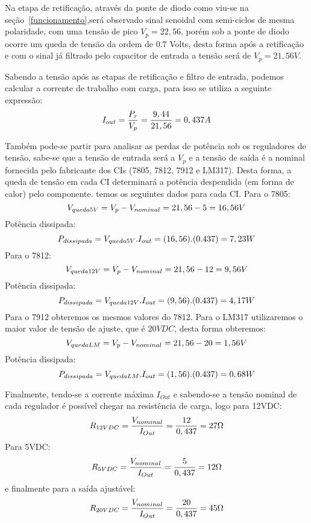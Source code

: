 \documentclass[
	article,			%
	11pt,				%
	oneside,			%
	a4paper,			%
	english,			%
	brazil,				%
	sumario=tradicional
	]{abntex2}
\begin{document}
Na etapa de retificação, através da ponte de diodo como viu-se na seção~\ref{funcionamento},será observado sinal senoidal com semi-ciclos de mesma polaridade, com uma tensão de pico $V_p = 22,56$, porém sob a ponte de diodo ocorre um queda de tensão da ordem de $0.7$ Volts, desta forma após a retificação e com o sinal já filtrado pelo capacitor de entrada a tensão será de \textbf{$V_p = 21,56V$}.

Sabendo a tensão após as etapas de retificação e filtro de entrada, podemos calcular a corrente de trabalho com carga, para isso se utiliza a seguinte expressão:
$$
I_{out} = \frac{P_r}{V_p}\nonumber\\
= \frac{9,44}{21,56}\nonumber\\
= 0,437 A
$$

Também pode-se partir para analisar as perdas de potência sob os reguladores de tensão, sabe-se que a tensão de entrada será a $V_p$ e a tensão de saída é a nominal fornecida pelo fabricante dos CIs (7805, 7812, 7912 e LM317). Desta forma, a queda de tensão em cada CI determinará a potência despendida (em forma de calor) pelo componente. temos os seguintes dados para cada CI. Para o 7805:
$$V_{queda5V} = V_p - V_{nominal}\\
= 21,56 - 5\\
= 16,56V
$$
Potência dissipada:
$$ P_{dissipada} = V_{queda5V}.I_{out}\\
= (16,56).(0.437)\\
= 7,23 W
$$
Para o 7812:
$$V_{queda12V} = V_p - V_{nominal}\\
= 21,56 - 12\\
= 9,56V
$$
Potência dissipada:
$$ P_{dissipada} = V_{queda12V}.I_{out}\\
= (9,56).(0.437)\\
= 4,17 W
$$
Para o 7912 obteremos os mesmos valores do 7812. Para o LM317 utilizaremos o maior valor de tensão de ajuste, que é $20VDC$, desta forma obteremos:
$$V_{quedaLM} = V_p - V_{nominal}\\
= 21,56 - 20\\
= 1,56V
$$
Potência dissipada:
$$ P_{dissipada} = V_{quedaLM}.I_{out}\\
= (1,56).(0.437)\\
= 0,68 W
$$

Finalmente, tendo-se a corrente máxima $I_{Out}$ e sabendo-se a tensão nominal de cada regulador é possível chegar na resistência de carga, logo para 12VDC:
$$R_{12VDC} = \frac{V_{nominal}}{I_{Out}} \\
= \frac{12}{0,437}\\
= 27 \Omega
$$
Para 5VDC:
$$R_{5VDC} = \frac{V_{nominal}}{I_{Out}} \\
= \frac{5}{0,437}\\
= 12 \Omega
$$
e finalmente para a saída ajustável:
$$R_{20VDC} = \frac{V_{nominal}}{I_{Out}} \\
=\frac{20}{0,437}\\
= 45 \Omega
$$
\end{document}
